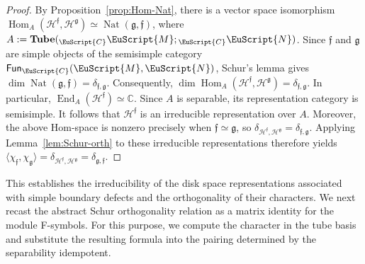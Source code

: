 \documentclass[a4paper,11pt]{article}
\theoremstyle{definition}
\theoremstyle{remark}
\newcommand\eC           {\EuScript{C}}
\newcommand\eM          {\EuScript{M}}
\newcommand\eN         {\EuScript{N}}
\newcommand{\Hom}{\operatorname{Hom}}
\newcommand{\End}{\operatorname{End}}
\newcommand{\Tube}{\mathbf{Tube}}
\newcommand{\Fun}{\mathsf{Fun}}
\begin{document}
\begin{proof}
By Proposition~\ref{prop:Hom-Nat}, there is a vector space isomorphism $\Hom_A(\mathcal H^{\mathfrak f},\mathcal H^{\mathfrak g})\simeq\operatorname{Nat}(\mathfrak g,\mathfrak f)$, where $A:=\Tube({}_{\eC}\eM;{}_{\eC}\eN)$. Since $\mathfrak f$ and $\mathfrak g$ are simple objects of the semisimple category $\Fun_{\eC}(\eM,\eN)$, Schur's lemma gives $\dim\operatorname{Nat}(\mathfrak g,\mathfrak f)=\delta_{\mathfrak f,\mathfrak g}$. Consequently, $\dim\Hom_A(\mathcal H^{\mathfrak f},\mathcal H^{\mathfrak g}) = \delta_{\mathfrak f,\mathfrak g}$. In particular, $\End_A(\mathcal H^{\mathfrak f})\simeq\mathbb C$. 
Since $A$ is separable, its representation category is semisimple. It follows that $\mathcal H^{\mathfrak f}$ is an irreducible representation over $A$.
Moreover, the above Hom-space is nonzero precisely when
$\mathfrak f\simeq\mathfrak g$, so $\delta_{\mathcal H^{\mathfrak f},\mathcal H^{\mathfrak g}} = \delta_{\mathfrak f,\mathfrak g}$.  Applying Lemma~\ref{lem:Schur-orth} to these irreducible
representations therefore yields $\langle \chi_{\mathfrak{f}},\chi_{\mathfrak{g}} \rangle = \delta_{\mathcal{H}^\mathfrak{f},\mathcal{H}^\mathfrak{g}} = \delta_{\mathfrak{g},\mathfrak{f}}$.
\end{proof}

This establishes the irreducibility of the disk space representations associated with simple boundary defects and the orthogonality of their characters. We next recast the abstract Schur orthogonality relation as a matrix identity for the module F-symbols. For this purpose, we compute the character in the tube basis and substitute the resulting formula into the pairing determined by the separability idempotent.
\end{document}
